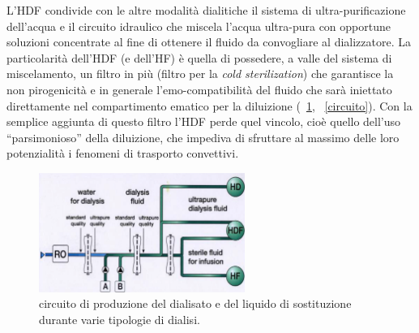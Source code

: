 L'HDF condivide con le altre modalità dialitiche il sistema di ultra-purificazione dell'acqua e il circuito idraulico che miscela l'acqua ultra-pura con opportune soluzioni concentrate al fine di ottenere il fluido da convogliare al dializzatore. La particolarità dell'HDF (e dell'HF) è quella di possedere, a valle del sistema di miscelamento, un filtro in più (filtro per la \textit{cold sterilization}) che garantisce la non pirogenicità e in generale l'emo-compatibilità del fluido che sarà iniettato direttamente nel compartimento ematico per la diluizione (\figurename~\ref{fluido}, \figurename~\ref{circuito}). Con la semplice aggiunta di questo filtro l'HDF perde quel vincolo, cioè quello dell'uso ``parsimonioso'' della diluizione, che impediva di sfruttare al massimo delle loro potenzialità i fenomeni di trasporto convettivi.
\begin{figure}[htb]
	\centering
		\includegraphics[width=0.6\textwidth]{immagini/NIC/fluido.eps}
		\caption{circuito di produzione del dialisato e del liquido di sostituzione durante varie tipologie di dialisi.}\label{fluido}
\end{figure}

